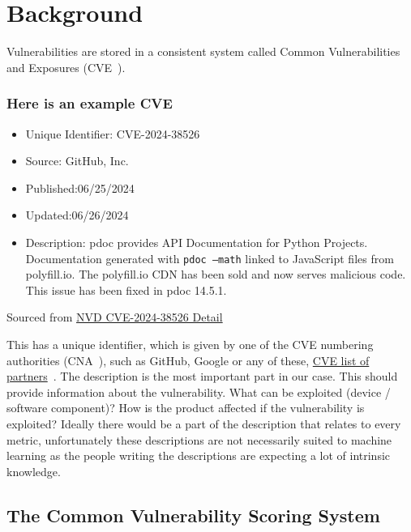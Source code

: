\documentclass[12pt]{article}
\begin{document}
\section{Background}

Vulnerabilities are stored in a consistent system called Common Vulnerabilities and
Exposures (CVE~\cite{CVE}).

\subsubsection*{Here is an example CVE}
\begin{itemize}
	\item   Unique Identifier: CVE-2024-38526
	\item   Source: GitHub, Inc.
	\item   Published:06/25/2024
	\item   Updated:06/26/2024

	\item   Description: pdoc provides API Documentation for Python Projects. Documentation
	      generated with \texttt{pdoc --math} linked to JavaScript files from polyfill.io. The polyfill.io
	      CDN has been sold and now serves malicious code. This issue has been fixed in pdoc 14.5.1.

\end{itemize}

{\footnotesize Sourced from \href{https://nvd.nist.gov/vuln/detail/CVE-2024-38526}{NVD CVE-2024-38526
	Detail} \cite{polyfill}} \\
\bigskip

This has a unique identifier, which is given by one of the CVE numbering authorities (CNA~\cite{CNA}), such as
GitHub, Google or any of these, \href{https://www.cve.org/PartnerInformation/ListofPartners}{CVE list of
	partners}~\cite{partners}.
The description is the most important part in our case. This should provide information about the
vulnerability. What can be exploited (device / software component)? How is the product affected if
the vulnerability is exploited? Ideally there would be a part of the description that relates to every metric,
unfortunately these descriptions are not necessarily suited to machine learning as the people
writing the descriptions are expecting a lot of intrinsic knowledge.

\subsection*{The Common Vulnerability Scoring System}
\end{document}
